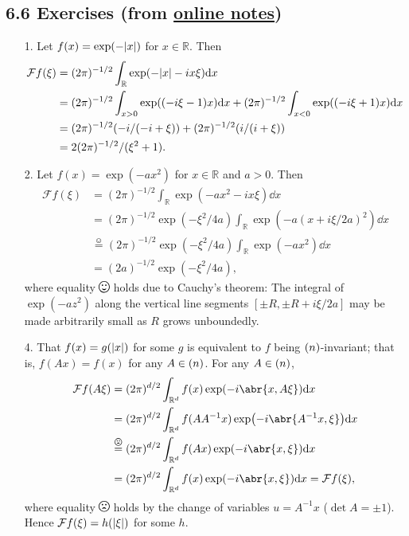 \documentclass[11pt,leqno]{article}
\theoremstyle{plain}
\theoremstyle{definition}
\numberwithin{equation}{section}
\numberwithin{lem}{section}
\newcommand{\eq}[1]{\overset{#1}{=}}
\let\O\relax
\newcommand{\O}{\mathrm O}
\newcommand{\smallhappy}{\smiley}
\newcommand{\happy}{\raisebox{-.14em}{\resizebox{1.2em}{!}{\smiley}}}
\newcommand{\smallsad}{\frownie}
\newcommand{\sad}{\raisebox{-.14em}{\resizebox{1.2em}{!}{\frownie}}}
\DeclareMathOperator{\mathhappy}{\!\happy\!}
\DeclareMathOperator{\smallmathhappy}{\!\smallhappy\!}
\DeclareMathOperator{\mathsad}{\!\sad\!}
\DeclareMathOperator{\smallmathsad}{\!\smallsad\!}
\begin{document}
\subsection*{6.6 Exercises (from \href{https://users.oden.utexas.edu/~arbogast/appMath08c.pdf}{online notes})}
\begin{enumerate}
    \item[1.] Let $f(x) = \exp(-\abs{x})$ for $x\in\mathbb R$. Then \begin{align*}
      \mathcal Ff(\xi) &= (2\pi)^{-1/2}\int_{\mathbb R} \exp(-\abs{x} - ix\xi)\dd x\\
      &= (2\pi)^{-1/2}\int_{x>0} \exp((-i\xi-1)x)\dd x + (2\pi)^{-1/2}\int_{x<0} \exp((-i\xi+1)x)\dd x\\
      &= (2\pi)^{-1/2}(-i/(-i + \xi)) + (2\pi)^{-1/2}(i/(i + \xi))\\
      &= 2(2\pi)^{-1/2}/(\xi^2+1).
    \end{align*}
    \item[2.] Let $f(x) = \exp(-ax^2)$ for $x\in\mathbb R$ and $a>0$. Then \begin{align*}
      \mathcal Ff(\xi) &= (2\pi)^{-1/2}\int_{\mathbb R} \exp(-ax^2-ix\xi)\dd x\\
      &= (2\pi)^{-1/2}\exp(-\xi^2/4a)\int_{\mathbb R} \exp(- a (x +i\xi/2a)^2)\dd x\\
      &\eq{\smallmathhappy} (2\pi)^{-1/2}\exp(-\xi^2/4a)\int_{\mathbb R} \exp(- ax^2)\dd x\\
      &= (2a)^{-1/2}\exp(-\xi^2/4a),
    \end{align*}
    where equality $\mathhappy$ holds due to Cauchy's theorem: The integral of $\exp(- az^2)$ along the vertical line segments $[\pm R,\pm R + i\xi/2a]$ may be made arbitrarily small as $R$ grows unboundedly.
    \item[4.] That $f(x) = g(\abs{x})$ for some $g$ is equivalent to $f$ being $\O(n)$-invariant; that is, $f(Ax) = f(x)$ for any $A\in \O(n)$. For any $A\in \O(n)$, \begin{align*}
      \mathcal Ff(A\xi) &= (2\pi)^{d/2}\int_{\mathbb R^d} f(x)\exp(-i\abr{x,A\xi})\dd x \\
      &= (2\pi)^{d/2}\int_{\mathbb R^d} f(AA^{-1}x)\exp(-i\abr{A^{-1}x,\xi})\dd x \\
      &\eq{\smallmathsad} (2\pi)^{d/2}\int_{\mathbb R^d} f(Ax)\exp(-i\abr{x,\xi})\dd x\\
      &= (2\pi)^{d/2}\int_{\mathbb R^d} f(x)\exp(-i\abr{x,\xi})\dd x = \mathcal Ff(\xi), 
    \end{align*}
    where equality $\mathsad$ holds by the change of variables $u = A^{-1}x$ ($\det A = \pm 1$). Hence $\mathcal Ff(\xi) = h(\abs{\xi})$ for some $h$. 


\end{enumerate}
\end{document}
